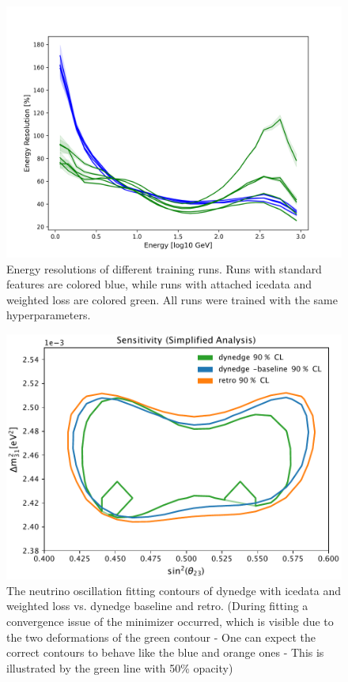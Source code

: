 \documentclass[a4paper,10pt]{scrartcl}
\begin{document}
\begin{figure}[H]
    \includegraphics[scale=0.65]{images/repeatability.png}
    \centering
    \caption{Energy resolutions of different training runs. Runs with standard features are colored blue, while runs with attached icedata and weighted loss are colored green. All runs were trained with the same hyperparameters.}
    \label{fig:repeatability}
\end{figure}

\begin{figure}[H]
    \includegraphics[scale=0.7]{images/2d_contour_test_fixed.pdf}
    \centering
    \caption{
        The neutrino oscillation fitting contours of dynedge with icedata and weighted loss vs. dynedge baseline and retro.
        (During fitting a convergence issue of the minimizer occurred, which is visible due to the two deformations of the green contour -
        One can expect the correct contours to behave like the blue and orange ones - This is illustrated by the green line with 50\% opacity)
    }
    \label{fig:contour}
\end{figure}

\newpage
\printbibliography
\end{document}
